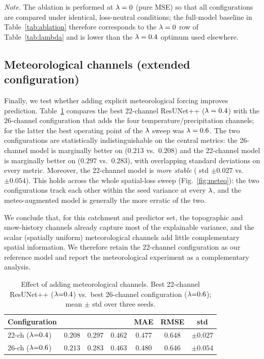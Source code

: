 \noindent\textit{Note.} The ablation is performed at $\lambda=0$ (pure MSE) so
that all configurations are compared under identical, loss-neutral conditions;
the full-model baseline in Table~\ref{tab:ablation} therefore corresponds to
the $\lambda=0$ row of Table~\ref{tab:lambda} and is lower than the
$\lambda=0.4$ optimum used elsewhere.

\subsection{Meteorological channels (extended configuration)}
\label{subsec:res_meteo}

Finally, we test whether adding explicit meteorological forcing improves
prediction. Table~\ref{tab:meteo} compares the best 22-channel ResUNet++
($\lambda=0.4$) with the 26-channel configuration that adds the four
temperature/precipitation channels; for the latter the best operating point of
the $\lambda$ sweep was $\lambda=0.6$. The two configurations are
statistically indistinguishable on the central metrics: the 26-channel model is
marginally better on \Rsq{} ($0.213$ vs.\ $0.208$) and the 22-channel model is
marginally better on \SPAEF{} ($0.297$ vs.\ $0.283$), with overlapping
standard deviations on every metric. Moreover, the 22-channel model is
\emph{more stable} (\Rsq{} std $\pm0.027$ vs.\ $\pm0.054$). This holds across
the whole spatial-loss sweep (Fig.~\ref{fig:meteo}): the two configurations
track each other within the seed variance at every $\lambda$, and the
meteo-augmented model is generally the more erratic of the two.

We conclude that, for this catchment and predictor set, the topographic and
snow-history channels already capture most of the explainable variance, and
the scalar (spatially uniform) meteorological channels add little
complementary spatial information. We therefore retain the 22-channel
configuration as our reference model and report the meteorological experiment
as a complementary analysis.

\begin{table}[t]
  \centering
  \caption{Effect of adding meteorological channels. Best 22-channel ResUNet++
  ($\lambda{=}0.4$) vs.\ best 26-channel configuration ($\lambda{=}0.6$); mean
  $\pm$ std over three seeds.}
  \label{tab:meteo}
  \small
  \begin{tabular}{lcccccc}
    \toprule
    Configuration & \Rsq{} & \SPAEF{} & \MSPAEF{} & MAE & RMSE & \Rsq{} std \\
    \midrule
    22-ch ($\lambda{=}0.4$) & $0.208$ & $\mathbf{0.297}$ & $0.462$ & $0.477$ & $0.648$ & $\mathbf{\pm0.027}$ \\
    26-ch ($\lambda{=}0.6$) & $\mathbf{0.213}$ & $0.283$ & $\mathbf{0.463}$ & $0.480$ & $\mathbf{0.646}$ & $\pm0.054$ \\
    \bottomrule
  \end{tabular}
\end{table}

